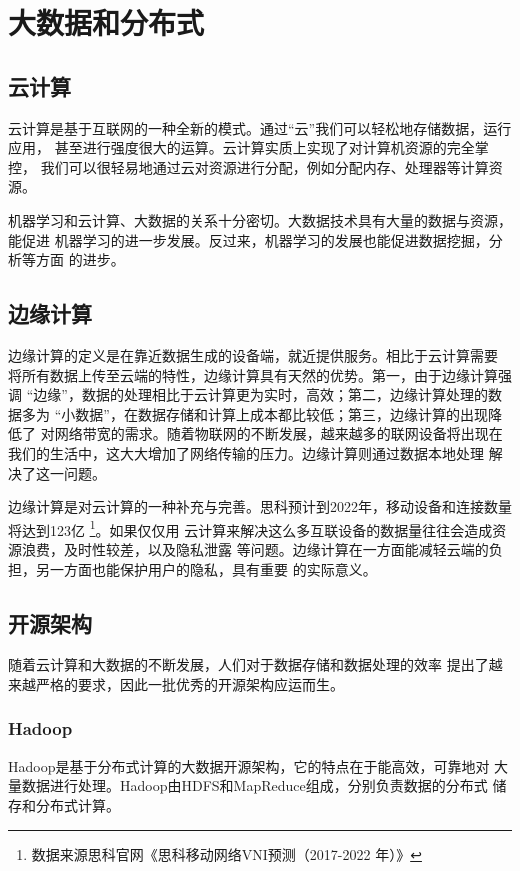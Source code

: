 \chapter{大数据和分布式}
\label{chap:java_ex_cloud}

\section{云计算}

云计算是基于互联网的一种全新的模式。通过“云”我们可以轻松地存储数据，运行应用，
甚至进行强度很大的运算。云计算实质上实现了对计算机资源的完全掌控，
我们可以很轻易地通过云对资源进行分配，例如分配内存、处理器等计算资源。

机器学习和云计算、大数据的关系十分密切。大数据技术具有大量的数据与资源，能促进
机器学习的进一步发展。反过来，机器学习的发展也能促进数据挖掘，分析等方面
的进步。

\section{边缘计算}
边缘计算的定义是在靠近数据生成的设备端，就近提供服务。相比于云计算需要
将所有数据上传至云端的特性，边缘计算具有天然的优势。第一，由于边缘计算强调
“边缘”，数据的处理相比于云计算更为实时，高效；第二，边缘计算处理的数据多为
“小数据”，在数据存储和计算上成本都比较低；第三，边缘计算的出现降低了
对网络带宽的需求。随着物联网的不断发展，越来越多的联网设备将出现在
我们的生活中，这大大增加了网络传输的压力。边缘计算则通过数据本地处理
解决了这一问题。

边缘计算是对云计算的一种补充与完善。思科预计到2022年，移动设备和连接数量将达到123亿
\footnote{数据来源思科官网《思科移动网络VNI预测（2017-2022 年）》}。如果仅仅用
云计算来解决这么多互联设备的数据量往往会造成资源浪费，及时性较差，以及隐私泄露
等问题。边缘计算在一方面能减轻云端的负担，另一方面也能保护用户的隐私，具有重要
的实际意义。

\section{开源架构}
随着云计算和大数据的不断发展，人们对于数据存储和数据处理的效率
提出了越来越严格的要求，因此一批优秀的开源架构应运而生。

\subsection{Hadoop}
Hadoop是基于分布式计算的大数据开源架构，它的特点在于能高效，可靠地对
大量数据进行处理。Hadoop由HDFS和MapReduce组成，分别负责数据的分布式
储存和分布式计算。

